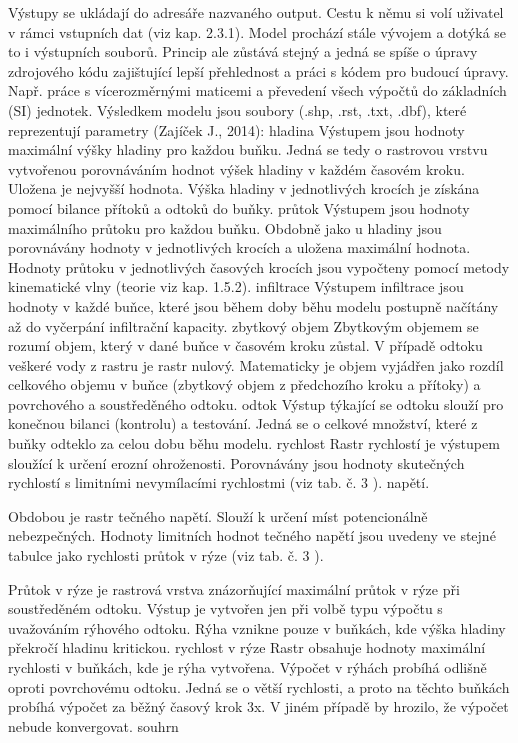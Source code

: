 {Výstupy se ukládají do adresáře nazvaného output. Cestu k němu si volí uživatel v rámci vstupních dat (viz kap. 2.3.1). Model prochází stále vývojem a dotýká se to i výstupních souborů. Princip ale zůstává stejný a jedná se spíše o úpravy zdrojového kódu zajištující lepší přehlednost a práci s kódem pro budoucí úpravy. Např. práce s vícerozměrnými maticemi a převedení všech výpočtů do základních (SI) jednotek. 
Výsledkem modelu jsou soubory (.shp, .rst, .txt, .dbf), které reprezentují parametry (Zajíček J., 2014):
hladina
Výstupem jsou hodnoty maximální výšky hladiny pro každou buňku. Jedná se tedy o rastrovou vrstvu vytvořenou porovnáváním hodnot výšek hladiny v každém časovém kroku. Uložena je nejvyšší hodnota. Výška hladiny v jednotlivých krocích je získána pomocí bilance přítoků a odtoků do buňky.  
průtok
Výstupem jsou hodnoty maximálního průtoku pro každou buňku. Obdobně jako u hladiny jsou porovnávány hodnoty v jednotlivých krocích a uložena maximální hodnota. Hodnoty průtoku v jednotlivých časových krocích jsou vypočteny pomocí metody kinematické vlny (teorie viz kap. 1.5.2).
infiltrace
Výstupem infiltrace jsou hodnoty v každé buňce, které jsou během doby běhu modelu postupně načítány až do vyčerpání infiltrační kapacity.
zbytkový objem
Zbytkovým objemem se rozumí objem, který v dané buňce v časovém kroku zůstal. V případě odtoku veškeré vody z rastru je rastr nulový. Matematicky je objem vyjádřen jako rozdíl celkového objemu v buňce (zbytkový objem z předchozího kroku a přítoky) a povrchového a soustředěného odtoku.
odtok
Výstup týkající se odtoku slouží pro konečnou bilanci (kontrolu) a testování. Jedná se o celkové množství, které z buňky odteklo za celou dobu běhu modelu. 
rychlost
Rastr rychlostí je výstupem sloužící k určení erozní ohroženosti. Porovnávány jsou hodnoty skutečných rychlostí s limitními nevymílacími rychlostmi (viz tab. č. 3 ).
napětí. 

Obdobou je rastr tečného napětí. Slouží k určení míst potencionálně nebezpečných. Hodnoty limitních hodnot tečného napětí jsou uvedeny ve stejné tabulce jako rychlosti průtok v rýze (viz tab. č. 3 ).

Průtok v rýze je rastrová vrstva znázorňující maximální průtok v rýze při soustředěném odtoku. Výstup je vytvořen jen při volbě typu výpočtu s uvažováním rýhového odtoku. Rýha vznikne pouze v buňkách, kde výška hladiny překročí hladinu kritickou. 
rychlost v rýze
Rastr obsahuje hodnoty maximální rychlosti v buňkách, kde je rýha vytvořena. Výpočet v rýhách probíhá odlišně oproti povrchovému odtoku. Jedná se o větší rychlosti, a proto na těchto buňkách probíhá výpočet za běžný časový krok 3x. V jiném případě by hrozilo, že výpočet nebude konvergovat.
souhrn

}
